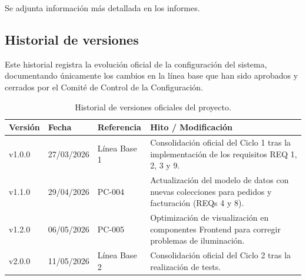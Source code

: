 \documentclass[11pt,a4paper]{article}
\begin{document}
Se adjunta información más detallada en los informes.

\subsection{Historial de versiones}

Este historial registra la evolución oficial de la configuración del sistema, documentando únicamente los cambios en la línea base que han sido aprobados y cerrados por el Comité de Control de la Configuración.

\begin{table}[H]
\centering
\small
\begin{tabularx}{\textwidth}{@{}l l l L@{}}
\toprule
\textbf{Versión} & \textbf{Fecha} & \textbf{Referencia} & \textbf{Hito / Modificación} \\ \midrule
v1.0.0 & 27/03/2026 & Línea Base 1 & Consolidación oficial del Ciclo 1 tras la implementación de los requisitos REQ 1, 2, 3 y 9. \\
v1.1.0 & 29/04/2026 & PC-004 & Actualización del modelo de datos con nuevas colecciones para pedidos y facturación (REQs 4 y 8). \\
v1.2.0 & 06/05/2026 & PC-005 & Optimización de visualización en componentes Frontend para corregir problemas de iluminación. \\
v2.0.0 & 11/05/2026 & Línea Base 2 & Consolidación oficial del Ciclo 2 tras la realización de tests. \\
\bottomrule
\end{tabularx}
\caption{Historial de versiones oficiales del proyecto.}
\end{table}
\end{document}

